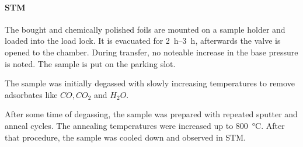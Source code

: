\paragraph{STM}
\label{sec:foil-STM}
The bought and chemically polished foils are mounted on a sample holder and loaded into the load lock. It is evacuated for \SIrange{2}{3}{\hour}, afterwards the valve is opened to the chamber. During transfer, no noteable increase in the base pressure is noted. The sample is put on the parking slot.

The sample was initially degassed with slowly increasing temperatures to remove adsorbates like $CO, CO_2$ and $H_2O$.

After some time of degassing, the sample was prepared with repeated sputter and anneal cycles. The annealing temperatures were increased up to \SI{800}{\degreeCelsius}. 
After that procedure, the sample was cooled down and observed in STM.